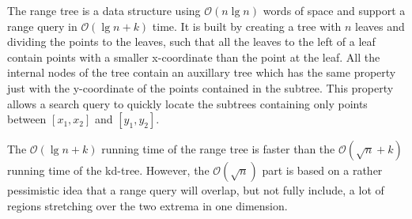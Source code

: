 The range tree is a data structure using $\mathcal{O}(n \lg n)$ words of space and support a range query in $\mathcal{O}(\lg n + k)$ time. It is built by creating a tree with $n$ leaves and dividing the points to the leaves, such that all the leaves to the left of a leaf contain points with a smaller x-coordinate than the point at the leaf. All the internal nodes of the tree contain an auxillary tree which has the same property just with the y-coordinate of the points contained in the subtree. This property allows a search query to quickly locate the subtrees containing only points between $[x_1, x_2]$ and $[y_1, y_2]$.

The $\mathcal{O}(\lg n + k)$ running time of the range tree is faster than the $\mathcal{O}(\sqrt{n} + k)$ running time of the kd-tree. However, the $\mathcal{O}(\sqrt{n})$ part is based on a rather pessimistic idea that a range query will overlap, but not fully include, a lot of regions stretching over the two extrema in one dimension.
